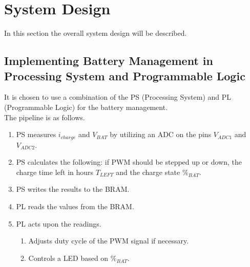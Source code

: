 \documentclass[../report.tex]{subfiles}
\begin{document}
\section{System Design} \label{sec:results}
In this section the overall system design will be described.

\subsection{Implementing Battery Management in Processing System and Programmable Logic}
It is chosen to use a combination of the PS (Processing System) and PL (Programmable Logic) for the battery management.\\
The pipeline is as follows.
\begin{enumerate}
    \item PS measures $i_{charge}$ and $V_{BAT}$ by utilizing an ADC on the pins $V_{ADC1}$ and $V_{ADC2}$.
    \item PS calculates the following: if PWM should be stepped up or down, the charge time left in hours $T_{LEFT}$ and the charge state $\%_{BAT}$.
    \item PS writes the results to the BRAM.
    \item PL reads the values from the BRAM.
    \item PL acts upon the readings.
    \begin{enumerate}
        \item Adjusts duty cycle of the PWM signal if necessary.
        \item Controls a LED based on $\%_{BAT}$.
    \end{enumerate}
\end{enumerate}
\end{document}
